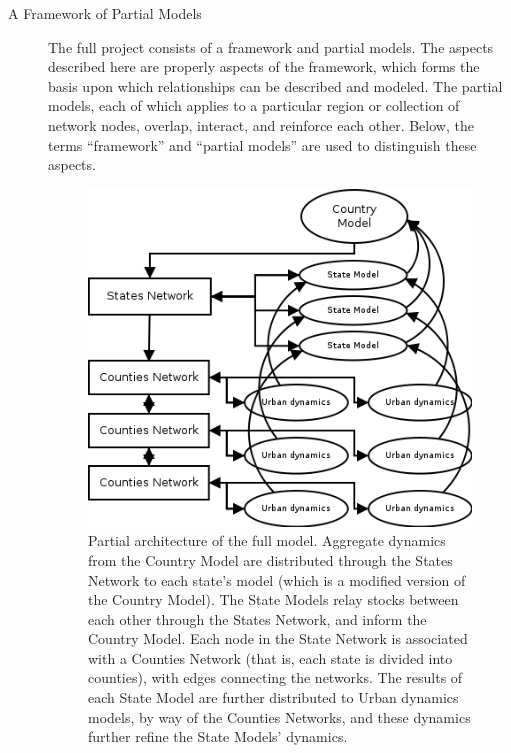 \documentclass[12pt, oneside]{amsart}
\begin{document}
\begin{description}
\item[A Framework of Partial Models] The full project consists of a framework and partial models.  The aspects described here are properly aspects of the framework, which forms the basis upon which relationships can be described and modeled.  The partial models, each of which applies to a particular region or collection of network nodes, overlap, interact, and reinforce each other.  Below, the terms ``framework'' and ``partial models'' are used to distinguish these aspects.
\begin{figure}[htb]
\includegraphics[width=4in]{architecture.png}
\caption{Partial architecture of the full model.  Aggregate dynamics from the Country Model are distributed through the States Network to each state's model (which is a modified version of the Country Model).  The State Models relay stocks between each other through the States Network, and inform the Country Model.  Each node in the State Network is associated with a Counties Network (that is, each state is divided into counties), with edges connecting the networks.  The results of each State Model are further distributed to Urban dynamics models, by way of the Counties Networks, and these dynamics further refine the State Models' dynamics.}
\end{figure}


\end{description}
\end{document}
